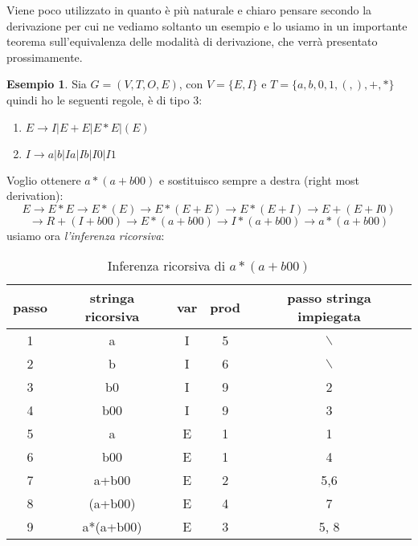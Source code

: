 \documentclass[a4paper]{book}
\theoremstyle{definition}%
\newtheorem*{esempio}{Esempio}
\begin{document}
  Viene poco utilizzato in quanto è più naturale e chiaro pensare secondo la derivazione per cui ne vediamo soltanto un esempio
  e lo usiamo in un importante teorema sull'equivalenza delle modalità di derivazione, che verrà presentato prossimamente.
  \begin{esempio}
    Sia $G=(V,T,O,E)$, con $V=\{E,I\}$ e $T=\{a,b,0,1,(,),+,*\}$ 
    quindi ho le seguenti regole, è di tipo 3:
    \begin{enumerate}
    \item $E\to I | E+E | E*E | (E)$
    \item $I\to a | b | Ia | Ib | I0 | I1$
    \end{enumerate}
    Voglio ottenere $a*(a+b00)$ e sostituisco sempre a destra (right most derivation):
    \[E\to E*E\to E*(E)\to E*(E+E)\to E*(E+I)\to E+(E+I0)\]
    \[\to R+(I+b00)\to E*(a+b00)\to I*(a+b00)\to a*(a+b00)\]
    usiamo ora \textit{l'inferenza ricorsiva}:
    \begin{table}
      \centering
    \caption{Inferenza ricorsiva di $a*(a+b00)$}
      \begin{tabular}{|c|c|c|c|c|}
        \toprule passo & stringa ricorsiva & var & prod & passo stringa impiegata\\
        \midrule 1 & a & I & 5 & $\backslash$ \\
        \hline
        2 & b & I & 6 & $\backslash$ \\ 
        \hline
        3 & b0 & I & 9 & 2\\
        \hline
        4 & b00 & I & 9 & 3\\
        \hline
        5 & a & E & 1 & 1 \\
        \hline
        6 & b00 & E & 1 & 4\\
        \hline
        7 & a+b00 & E & 2 & 5,6\\
        \hline
        8 & (a+b00) & E & 4 & 7\\
        \hline
        9 &a*(a+b00) & E & 3 & 5, 8\\
        \hline
      \end{tabular}
    \end{table}
  \end{esempio}

\end{document}
